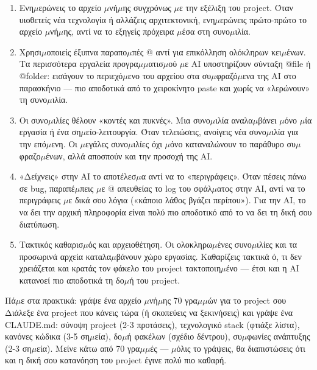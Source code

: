 \begin{enumerate}
  \item Ενη$\mu$ερώνεις το αρχείο $\mu$νή$\mu$ης συγχρόνως $\mu$ε την εξέλιξη του project. Όταν υιοθετείς νέα τεχνολογία ή αλλάζεις αρχιτεκτονική, ενη$\mu$ερώνεις πρώτο-πρώτο το αρχείο $\mu$νή$\mu$ης, αντί να το εξηγείς πρόχειρα $\mu$έσα στη συνο$\mu$ιλία.
  \item Χρησι$\mu$οποιείς έξυπνα παραπο$\mu$πές @ αντί για επικόλληση ολόκληρων κει$\mu$ένων. Τα περισσότερα εργαλεία προγρα$\mu$$\mu$ατισ$\mu$ού $\mu$ε AI υποστηρίζουν σύνταξη @file ή @folder: εισάγουν το περιεχό$\mu$ενο του αρχείου στα συ$\mu$φραζό$\mu$ενα της AI στο παρασκήνιο — πιο αποδοτικά από το χειροκίνητο paste και χωρίς να «λερώνουν» τη συνο$\mu$ιλία.
  \item Οι συνο$\mu$ιλίες θέλουν «κοντές και πυκνές». Μια συνο$\mu$ιλία αναλα$\mu$βάνει $\mu$όνο $\mu$ία εργασία ή ένα ση$\mu$είο-λειτουργία. Όταν τελειώσεις, ανοίγεις νέα συνο$\mu$ιλία για την επό$\mu$ενη. Οι $\mu$εγάλες συνο$\mu$ιλίες όχι $\mu$όνο καταναλώνουν το παράθυρο συ$\mu$φραζο$\mu$ένων, αλλά αποσπούν και την προσοχή της AI.
  \item «Δείχνεις» στην AI το αποτέλεσ$\mu$α αντί να το «περιγράφεις». Όταν πέσεις πάνω σε bug, παραπέ$\mu$πεις $\mu$ε @ απευθείας το log του σφάλ$\mu$ατος στην AI, αντί να το περιγράφεις $\mu$ε δικά σου λόγια («κάποιο λάθος βγάζει περίπου»). Για την AI, το να δει την αρχική πληροφορία είναι πολύ πιο αποδοτικό από το να δει τη δική σου διατύπωση.
  \item Τακτικός καθαρισ$\mu$ός και αρχειοθέτηση. Οι ολοκληρω$\mu$ένες συνο$\mu$ιλίες και τα προσωρινά αρχεία καταλα$\mu$βάνουν χώρο εργασίας. Καθαρίζεις τακτικά ό, τι δεν χρειάζεται και κρατάς τον φάκελο του project τακτοποιη$\mu$ένο — έτσι και η AI κατανοεί πιο αποδοτικά τη δο$\mu$ή του project.
\end{enumerate}

\begin{tcbpractice}{Πά$\mu$ε στα πρακτικά: γράψε ένα αρχείο $\mu$νή$\mu$ης 70 γρα$\mu$$\mu$ών για το project σου}
Διάλεξε ένα project που κάνεις τώρα (ή σκοπεύεις να ξεκινήσεις) και γράψε ένα CLAUDE.md: σύνοψη project (2-3 προτάσεις), τεχνολογικό stack (φτιάξε λίστα), κανόνες κώδικα (3-5 ση$\mu$εία), δο$\mu$ή φακέλων (σχέδιο δέντρου), συ$\mu$φωνίες ανάπτυξης (2-3 ση$\mu$εία). Μείνε κάτω από 70 γρα$\mu$$\mu$ές — $\mu$όλις το γράψεις, θα διαπιστώσεις ότι και η δική σου κατανόηση του project έγινε πολύ πιο καθαρή.

\end{tcbpractice}

